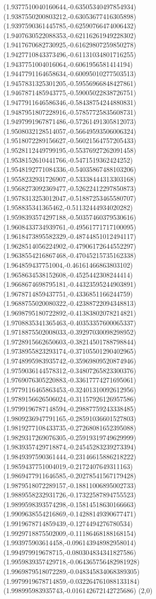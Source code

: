 \documentclass[12pt]{article}
\theoremstyle{plain}
\theoremstyle{definition}
\theoremstyle{remark}
\begin{document}
\begin{figure}
{  (1.9377510040160644,-0.63505340497854934)%
  (1.9387550200803212,-0.63053677416305898)%
  (1.9397590361445785,-0.62590766474006432)%
  (1.9407630522088353,-0.62116261949228302)%
  (1.9417670682730925,-0.61629807259850278)%
  (1.9427710843373496,-0.61131034801716255)%
  (1.9437751004016064,-0.6061956581414194)%
  (1.9447791164658634,-0.60095010277503513)%
  (1.9457831325301205,-0.59556966848427861)%
  (1.9467871485943775,-0.59005022838726751)%
  (1.9477911646586346,-0.58438754244880831)%
  (1.9487951807228916,-0.57857725835608731)%
  (1.9497991967871486,-0.57261491305812073)%
  (1.9508032128514057,-0.56649593506006324)%
  (1.9518072289156627,-0.56021564757205433)%
  (1.9528112449799195,-0.55376927262091458)%
  (1.9538152610441766,-0.5471519362424252)%
  (1.9548192771084336,-0.54035867488103206)%
  (1.9558232931726907,-0.53338444313303168)%
  (1.9568273092369477,-0.52622412297850873)%
  (1.9578313253012047,-0.51887253465580707)%
  (1.958835341365462,-0.51132444934020282)%
  (1.9598393574297188,-0.50357460379530616)%
  (1.9608433734939761,-0.49561771717100095)%
  (1.9618473895582329,-0.48744851012494117)%
  (1.9628514056224902,-0.47906172644552297)%
  (1.9638554216867468,-0.47045215735162338)%
  (1.964859437751004,-0.46161466863803102)%
  (1.9658634538152608,-0.4525442308244414)%
  (1.9668674698795181,-0.44323595244903891)%
  (1.9678714859437751,-0.4336851166244759)%
  (1.9688755020080322,-0.42388722094348813)%
  (1.9698795180722892,-0.41383802078214821)%
  (1.9708835341365463,-0.40353357600065337)%
  (1.9718875502008033,-0.39297030098298952)%
  (1.9728915662650603,-0.38214501788798844)%
  (1.9738955823293174,-0.37105501290402965)%
  (1.9748995983935742,-0.35969809520874946)%
  (1.9759036144578312,-0.34807265823300376)%
  (1.9769076305220883,-0.33617774271695061)%
  (1.9779116465863453,-0.32401310092612956)%
  (1.9789156626506024,-0.31157926126957586)%
  (1.9799196787148594,-0.29887759243338485)%
  (1.9809236947791165,-0.28591036601527803)%
  (1.9819277108433735,-0.27268081652395088)%
  (1.9829317269076305,-0.25919319749629999)%
  (1.9839357429718874,-0.24545283239273394)%
  (1.9849397590361444,-0.23146615886218222)%
  (1.9859437751004019,-0.2172407649311163)%
  (1.9869477911646585,-0.20278541567179428)%
  (1.9879518072289157,-0.18811006895002733)%
  (1.9889558232931726,-0.17322587894755523)%
  (1.9899598393574298,-0.15814518630166663)%
  (1.9909638554216869,-0.14288149390677471)%
  (1.9919678714859439,-0.1274494276780534)%
  (1.9929718875502009,-0.11186468188168154)%
  (1.993975903614458,-0.096143948982958014)%
  (1.994979919678715,-0.080304834341827586)%
  (1.9959839357429718,-0.064365756482981928)%
  (1.9969879518072289,-0.048345834068389305)%
  (1.9979919678714859,-0.032264761088133184)%
  (1.998995983935743,-0.016142672142725686)%
  (2,0)%
}


\end{figure}
\end{document}
